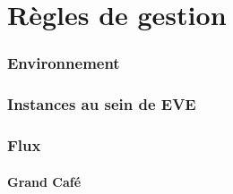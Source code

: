 \section{Règles de gestion}
\label{gestion}
\subsubsection{Environnement}
\subsubsection{Instances au sein de EVE}
\subsubsection{Flux}
\paragraph{Grand Café}
